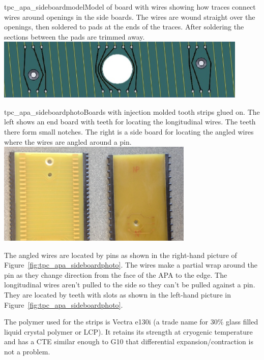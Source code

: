 \begin{cdrfigure}{tpc_apa_sideboardmodel}{Model of board with wires showing how traces connect wires around openings in the side boards.  The wires are wound straight over the openings, then soldered to pads at the ends of the traces.  After soldering the sections between the pads are trimmed away.}
\includegraphics[width=0.9\textwidth]{figures/tpc_apa_sideboardmodel.png} 
\end{cdrfigure}


\begin{cdrfigure}{tpc_apa_sideboardphoto}{Boards with injection molded tooth strips glued on.  The left shows an end board with teeth for locating the longitudinal wires.  The teeth there form small notches. The right is a side board for locating the angled wires where the wires are angled around a pin.}
\includegraphics[width=0.7\textwidth]{figures/tpc_apa_sideboardphoto.png} 
\end{cdrfigure}

The angled wires are located by pins as shown in the right-hand picture of Figure~\ref{fig:tpc_apa_sideboardphoto}.  The wires make a partial wrap around the pin as they change direction from the face of the APA to the edge.  The longitudinal wires aren't pulled to the side so they can't be pulled against a pin.  They are located by teeth with slots as shown in the left-hand picture in Figure~\ref{fig:tpc_apa_sideboardphoto}. 
	
The polymer used for the strips is Vectra e130i (a trade name for 30$\%$ glass filled liquid crystal polymer or LCP). It retains its strength at cryogenic temperature and has a CTE similar enough to G10 that differential expansion/contraction is not a problem.

